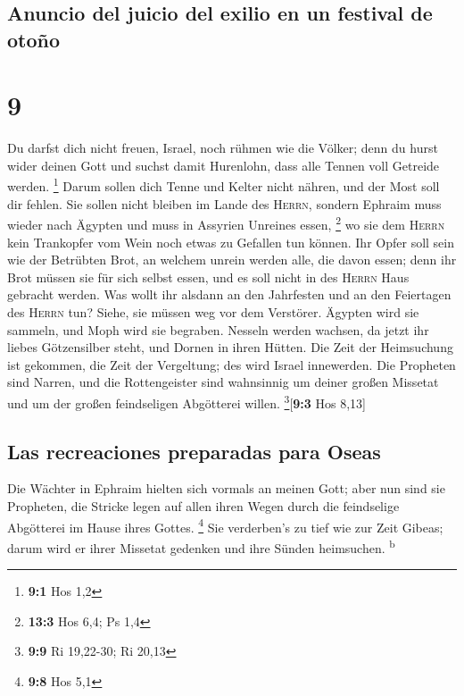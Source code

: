 \hypertarget{anuncio-del-juicio-del-exilio-en-un-festival-de-otouxf1o}{%
\subsection{Anuncio del juicio del exilio en un festival de
otoño}\label{anuncio-del-juicio-del-exilio-en-un-festival-de-otouxf1o}}

\hypertarget{section-8}{%
\section{9}\label{section-8}}

 Du darfst dich nicht freuen, Israel, noch rühmen wie die
Völker; denn du hurst wider deinen Gott und suchst damit Hurenlohn, dass
alle Tennen voll Getreide werden. \footnote{\textbf{9:1} Hos 1,2}
 Darum sollen dich Tenne und Kelter nicht nähren, und der
Most soll dir fehlen.  Sie sollen nicht bleiben im Lande
des \textsc{Herrn}, sondern Ephraim muss wieder nach Ägypten und muss in
Assyrien Unreines essen, \footnote{\textbf{13:3} Hos 6,4; Ps 1,4}
 wo sie dem \textsc{Herrn} kein Trankopfer vom Wein noch
etwas zu Gefallen tun können. Ihr Opfer soll sein wie der Betrübten
Brot, an welchem unrein werden alle, die davon essen; denn ihr Brot
müssen sie für sich selbst essen, und es soll nicht in des
\textsc{Herrn} Haus gebracht werden.  Was wollt ihr
alsdann an den Jahrfesten und an den Feiertagen des \textsc{Herrn} tun?
 Siehe, sie müssen weg vor dem Verstörer. Ägypten wird sie
sammeln, und Moph wird sie begraben. Nesseln werden wachsen, da jetzt
ihr liebes Götzensilber steht, und Dornen in ihren Hütten.
 Die Zeit der Heimsuchung ist gekommen, die Zeit der
Vergeltung; des wird Israel innewerden. Die Propheten sind Narren, und
die Rottengeister sind wahnsinnig um deiner großen Missetat und um der
großen feindseligen Abgötterei willen. \footnote{\textbf{9:9} Ri
  19,22-30; Ri 20,13}{[}\textbf{9:3} Hos 8,13{]}

\hypertarget{las-recreaciones-preparadas-para-oseas}{%
\subsection{Las recreaciones preparadas para
Oseas}\label{las-recreaciones-preparadas-para-oseas}}

 Die Wächter in Ephraim hielten sich vormals an meinen
Gott; aber nun sind sie Propheten, die Stricke legen auf allen ihren
Wegen durch die feindselige Abgötterei im Hause ihres Gottes.
\footnote{\textbf{9:8} Hos 5,1}  Sie verderben's zu tief
wie zur Zeit Gibeas; darum wird er ihrer Missetat gedenken und ihre
Sünden heimsuchen. \textsuperscript{b}

